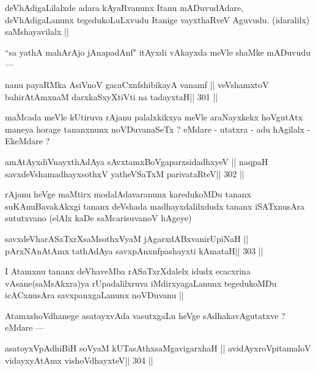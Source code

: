 \begin{artha}
deVhAdigaLilalxde adara kAyaRvanunx Itanu mADuvudAdare, deVhAdigaLanunx tegedukoLuLxvudu Itanige vayxthaRveV Aguvudu. (idaralilx) saMshayavilalx ||
\end{artha}

\begin{artha}
``sa yathA mahArAjo jAnapadAnf" itAyxdi vAkayxda meVle shaMke mADuvudu ---
\end{artha}

\begin{shl}
nanu payaRMka AsiVnoV gacaCxnfshibikayA vanamf ||
veVshamxtoV bahirAtAmxnaM darxkaSxyXtiVti na tadayxtaH\hfill || 301 ||
\end{shl}

\begin{artha}
maMcada meVle kUtiruva rAjanu palalxkikxya meVle araNayxkekx hoVgutAtx maneya horage tananxnunx noVDuvanaSeTx ? eMdare - utatxra - adu hAgilalx - EkeMdare ?
\end{artha}

\begin{shl}
amAtAyxdiVnayxthA\s\s dAya sAvxtamxBoVgaparxsidadhxyeV ||
naqpaH savxdeVshamadhayxsothxV yatheVSaTxM parivataRteV\hfill || 302 ||
\end{shl}

\begin{artha}
rAjanu heVge maMtirx modalAdavaranunx karedukoMDu tananx suKAnuBavakAkxgi tananx deVshada madhayxdalilxdudx tananx iSATxnusAra sututxvano (elAlx kaDe saMcarisuvanoV hAgeye)
\end{artha}

\begin{shl}
savxdeVharASaTxrXsaMsothxV\s yaM jAgarxdABxvanirUpiNaH ||
pArxNAnAtAmx tathA\s\s dAya savxpAnxnfpashayxti kAmataH\hfill || 303 ||
\end{shl}

\begin{artha}
I Atamxnu tananx deVhaveMba rASaTxrXdalelx idudx ecacxrina vAsane(saMsAkxra)ya rUpadalilxruva iMdirxyagaLanunx tegedukoMDu icACxnusAra savxpanxgaLanunx noVDuvanu ||
\end{artha}

\begin{artha}
AtamxshoVdhanege asatayxvAda vasutxgaLu heVge sAdhakavAgutatxve ? eMdare ---
\end{artha}

\begin{shl}
asatoyxVpAdhiBiH soV\s yaM kUTasAthxsaMgavigarxhaH ||
avidAyxroVpitamaloV vidayxyA\s\s tAmx vishoVdhayxteV\hfill || 304 ||
\end{shl}

